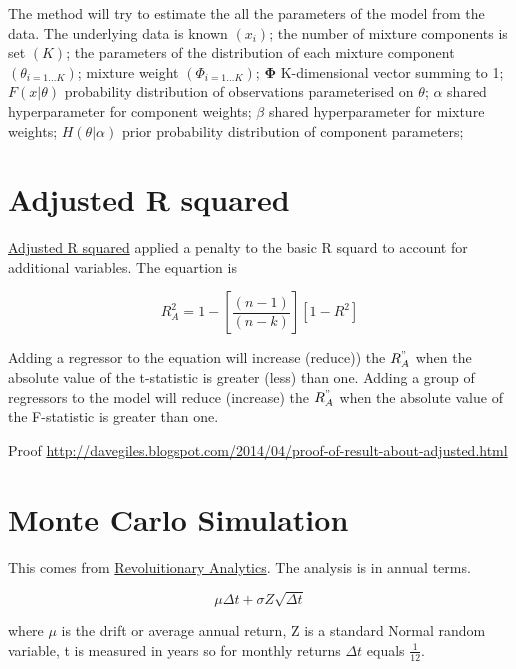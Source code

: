 \documentclass[12pt, a4paper, oneside]{article}\usepackage[]{graphicx}\usepackage[]{color}
\begin{document}
The method will try to estimate the all the parameters of the model from the data.  The underlying data is known $(x_i)$; the number of mixture components is set $(K)$; the parameters of the distribution of each mixture component $(\theta_{i=1\dots K})$; mixture weight $(\Phi_{i = 1\dots K})$; $\mathbf{\Phi}$ K-dimensional vector summing to 1; $F(x|\theta)$ probability distribution of observations parameterised on $\theta$; $\alpha$ shared hyperparameter for component weights; $\beta$ shared hyperparameter for mixture weights; $H(\theta|\alpha)$ prior probability distribution of component parameters; 

\section{Adjusted R squared}
\href{http://davegiles.blogspot.ca/2013/05/when-will-adjusted-r-squared-increase.html}{Adjusted R squared} applied a penalty to the basic R squard to account for additional variables.  The equartion is 

\begin{equation}
R_A^2 = 1 - \left [ \frac{(n-1)}{(n-k)} \right ] [1 - R^2]
\end{equation}

Adding a regressor to the equation will increase (reduce)) the $R_A^"$ when the absolute value of the t-statistic is greater (less) than one. Adding a group of regressors to the model will reduce (increase) the $R_A^"$ when the absolute value of the F-statistic is greater than one.  

Proof \href{http://davegiles.blogspot.com/2014/04/proof-of-result-about-adjusted.html}{http://davegiles.blogspot.com/2014/04/proof-of-result-about-adjusted.html}


\section{Monte Carlo Simulation}
This comes from \href{http://blog.revolutionanalytics.com/2014/04/quantitative-finance-applications-in-r-5.html}{Revoluitionary Analytics}.  The analysis is in annual terms.  

\begin{equation}
\mu \Delta t + \sigma Z \sqrt{\Delta t}
\end{equation}

where $\mu$ is the drift or average annual return, Z is a standard Normal random variable, t is measured in years so for monthly returns $\Delta t$ equals $\frac{1}{12}$.
\end{document}
